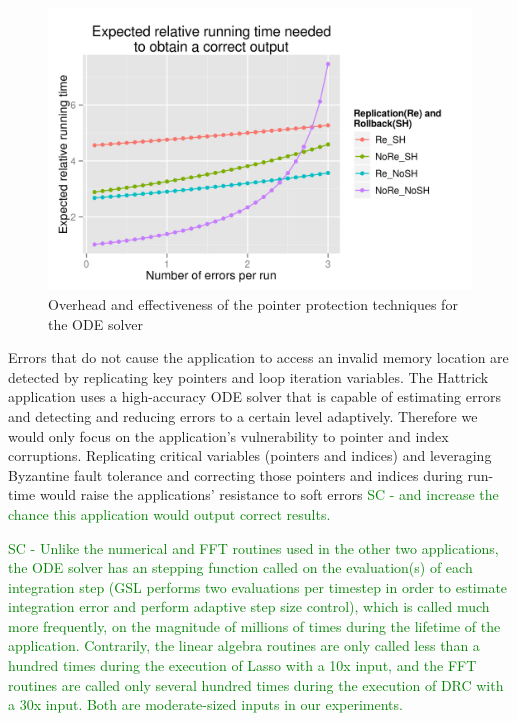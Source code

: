 \documentclass{sig-alternate}
\newcommand{\sui}[1]{%
  \textcolor{green}{SC - #1}
}
\begin{document}
\begin{figure}[ht!]
\includegraphics[width=1.00\columnwidth]{figs/4_1_2_Exp2_Expected_Running_Time_Needed.png}
\caption{Overhead and effectiveness of the pointer protection techniques for the ODE solver}
\label{fig:rk4_eff_ovhd}
\end{figure}

Errors that do not cause the application to access an invalid memory location are detected by replicating key pointers and loop iteration variables.
The Hattrick application uses a high-accuracy ODE solver that is capable of estimating errors and detecting and reducing errors to a certain level adaptively.
Therefore we would only focus on the application's vulnerability to pointer and index corruptions.
Replicating critical variables (pointers and indices) and leveraging Byzantine fault tolerance and correcting those pointers and indices during run-time would raise the applications' resistance to soft errors \sui{and increase the chance this application would output correct results.}

\sui{Unlike the numerical and FFT routines used in the other two applications, the ODE solver has an stepping function called on the evaluation(s) of each integration step (GSL performs two evaluations per timestep in order to estimate integration error and perform adaptive step size control), which is called much more frequently, on the magnitude of millions of times during the lifetime of the application. Contrarily, the linear algebra routines are only called less than a hundred times during the execution of Lasso with a 10x input, and the FFT routines are called only several hundred times during the execution of DRC with a 30x input. Both are moderate-sized inputs in our experiments.}
\end{document}
